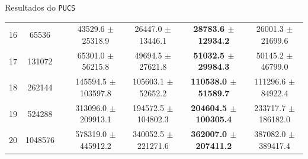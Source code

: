 \documentclass{beamer}
\newcommand{\algname}[1]{\texttt{#1}}
\begin{document}
\begin{frame}{Resultados do \algname{PUCS}}
\begin{table}
{\begin{tabular}{cc c cccc}
16 &   65536 && 43529.6 $\pm$ 25318.9 & 26447.0 $\pm$ 13446.1 & \textbf{28783.6 $\pm$ 12934.2} & 26001.3 $\pm$ 21699.6 \\
17 &  131072 && 65301.0 $\pm$ 56215.8 & 49694.5 $\pm$ 27621.8 & \textbf{51032.5 $\pm$ 29984.3} & 50145.2 $\pm$ 46799.0 \\
18 &  262144 && 145594.5 $\pm$ 103597.8 & 105603.1 $\pm$ 52652.2 & \textbf{110538.0 $\pm$ 51589.7} & 111296.6 $\pm$ 84922.4 \\
19 &  524288 && 313096.0 $\pm$ 209913.1 & 194572.5 $\pm$ 104802.3 & \textbf{204604.5 $\pm$ 100305.4} & 233717.7 $\pm$ 186182.0 \\
20 & 1048576 && 578319.0 $\pm$ 445912.2 & 340052.5 $\pm$ 221271.6 & \textbf{362007.0 $\pm$ 207411.2} & 387082.0 $\pm$ 389417.4 \\
\bottomrule
\end{tabular}
}
\end{table}
\end{frame}
\end{document}
